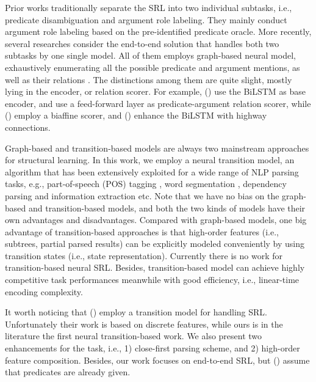 \documentclass[letterpaper]{article} \usepackage{aaai21}  \usepackage{times}  \usepackage{helvet} \usepackage{courier}  \usepackage[hyphens]{url}  \usepackage{graphicx} \urlstyle{rm} \def\UrlFont{\rm}  \usepackage{natbib}  \usepackage{caption}
\begin{document}
\begin{CJK}{UTF8}{gbsn}
Prior works traditionally separate the SRL into two individual subtasks, i.e., predicate disambiguation and argument role labeling.
They mainly conduct argument role labeling based on the pre-identified predicate oracle.
More recently, several researches consider the end-to-end solution that handles both two subtasks by one single model.
All of them employs graph-based neural model, exhaustively enumerating all the possible predicate and argument mentions, as well as their relations \cite{he-etal-2018-jointly,cai-etal-2018-full,LiHZZZZZ19,fei-etal-2020-high}.
The distinctions among them are quite slight, mostly lying in the encoder, or relation scorer.
For example, \citeauthor{he-etal-2018-jointly} (\citeyear{he-etal-2018-jointly}) use the BiLSTM \cite{hochreiter1997long} as base encoder, and use a feed-forward layer as predicate-argument relation scorer, while \citeauthor{cai-etal-2018-full} (\citeyear{cai-etal-2018-full}) employ a biaffine scorer, and \citeauthor{LiHZZZZZ19} (\citeyear{he-etal-2018-jointly}) enhance the BiLSTM with highway connections.




Graph-based and transition-based models are always two mainstream approaches for structural learning. 
In this work, we employ a neural transition model, an algorithm that has been extensively exploited for a wide range of NLP parsing tasks, e.g., part-of-speech (POS) tagging \cite{zhang-clark-2010-fast,LyuZJ16}, word segmentation \cite{zhang-etal-2016-transition,ZhangZF18}, dependency parsing \cite{zhou-etal-2015-neural,dyer-etal-2015-transition,YuanJT19} and information extraction  \cite{wang-etal-2018-neural-transition,ZhangQZLJ19}etc.
Note that we have no bias on the graph-based and transition-based models, and both the two kinds of models have their own advantages and disadvantages.
Compared with graph-based models, one big advantage of transition-based approaches is that high-order features (i.e., subtrees, partial parsed results) can be explicitly modeled conveniently by using
transition states (i.e., state representation). 
Currently there is no work for transition-based neural SRL.
Besides, transition-based model can achieve highly competitive task performances meanwhile with good efficiency, i.e., linear-time encoding complexity.



It worth noticing that \citeauthor{choi-palmer-2011-transition} (\citeyear{choi-palmer-2011-transition}) employ a transition model for handling SRL.
Unfortunately their work is based on discrete features, while ours is in the literature the first neural transition-based work.
We also present two enhancements for the task, i.e., 1) close-first parsing scheme, and 2) high-order feature composition. 
Besides, our work focuses on end-to-end SRL, but \citeauthor{choi-palmer-2011-transition} (\citeyear{choi-palmer-2011-transition}) assume that predicates are already given.








\end{CJK}
\end{document}
